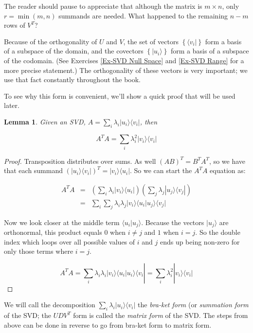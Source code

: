 \documentclass{amsbook}
\newtheorem{lemma}[theorem]{Lemma}
\begin{document}
The reader should pause to appreciate that although the matrix is $m\times n$, only $r=\min(m, n)$ summands are needed.  What happened to the remaining $n-m$ rows of $V^T$?

Because of the orthogonality of $U$ and $V$, the set of vectors $\left\{\langle v _i|\right\}$ form a basis of a subspace of the domain, and the covectors $\left\{| u_i \rangle\right\}$ form a basis of a subspace of the codomain.  (See Exercises \ref{Ex-SVD Null Space} and \ref{Ex-SVD Range} for a more precise statement.)  The orthogonality of these vectors is very important; we use that fact constantly throughout the book.

To see why this form is convenient, we'll show a quick proof that will be used later.

\begin{lemma}
\label{ATASimplification}
Given an SVD, $A=\sum_i\lambda_i|u_i\rangle\langle v_i|$, then 

\begin{equation}
A^TA=\sum_i\lambda_i^2|v_i\rangle\langle v_i|
\end{equation}
\end{lemma}

\begin{proof}
Transposition distributes over sums.  As well $(AB)^T=B^TA^T$, so we have that each summand $\left(|u_i\rangle\langle v_i|\right)^T=|v_i\rangle\langle u_i|$.  So we can start the $A^TA$ equation as:

$$
\begin{array}{rcl}
A^TA&=& \left(\sum_i\lambda_i|v_i\rangle\langle u_i|\right) \left(\sum_j\lambda_j|u_j\rangle\langle v_j|\right) \\
&=&\sum_i\sum_j\lambda_i\lambda_j|v_i\rangle\langle u_i|u_j\rangle\langle v_j|
\end{array}
$$

Now we look closer at the middle term $\langle u_i|u_j\rangle$.  Because the vectors $|u_j\rangle$ are orthonormal, this product equals $0$ when $i\neq j$ and $1$ when $i=j$.  So the double index which loops over all possible values of $i$ and $j$ ends up being non-zero for only those terms where $i=j$.

$$
A^TA = \sum_i\lambda_i\lambda_i|v_i\rangle\langle u_i|u_i\rangle\langle v_i| = \sum_i\lambda_i^2|v_i\rangle\langle v_i|
$$
\end{proof}

We will call the decomposition $\sum_i\lambda_i|u_i\rangle\langle v_i|$ the {\it bra-ket form} (or {\it summation form} of the SVD; the $UDV^T$ form is called the {\it matrix form} of the SVD.  The steps from above can be done in reverse to go from bra-ket form to matrix form.
\end{document}
